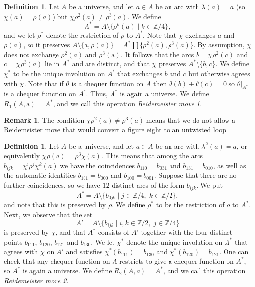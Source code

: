 \documentclass{amsart}
\newcommand{\Z}         {{\mathbb{Z}}}
\newcommand{\sm}        {\setminus}
\newcommand{\st}        {\;|\;}
\newcommand{\tht}       {\theta}
\newcommand{\lm}        {\lambda}
\renewcommand{\:}{\colon}
\theoremstyle{definition}
\newtheorem{remark}[theorem]{Remark}
\newtheorem{definition}[theorem]{Definition}
\begin{document}
\begin{definition}
 Let $A$ be a universe, and let $a\in A$ be an arc with
 $\lm(a)=a$ (so $\chi(a)=\rho(a)$) but
 $\chi\rho^2(a)\neq\rho^3(a)$.  We define  
 \[ A^* = A \sm \{\rho^k(a)\st k\in\Z/4\}, \]
 and we let $\rho^*$ denote the restriction of $\rho$ to $A^*$.  Note
 that $\chi$ exchanges $a$ and $\rho(a)$, so it preserves
 $A\sm\{a,\rho(a)\}=A^*\amalg\{\rho^2(a),\rho^3(a)\}$.  By assumption,
 $\chi$ does not exchange $\rho^2(a)$ and $\rho^3(a)$.  It follows
 that the arcs $b=\chi\rho^2(a)$ and $c=\chi\rho^3(a)$ lie in $A^*$
 and are distinct, and that $\chi$ preserves $A^*\sm\{b,c\}$.  We
 define $\chi^*$ to be the unique involution on $A^*$ that exchanges
 $b$ and $c$ but otherwise agrees with $\chi$.  Note that if $\tht$ is
 a chequer function on $A$ then $\tht(b)+\tht(c)=0$ so $\tht|_{A^*}$
 is a chequer function on $A^*$.  Thus, $A^*$ is again a universe.  We
 define $R_1(A,a)=A^*$, and we call this operation \emph{Reidemeister
  move 1}.
\end{definition}

\begin{remark}
 The condition $\chi\rho^2(a)\neq\rho^3(a)$ means that we do not allow
 a Reidemeister move that would convert a figure eight to an untwisted
 loop.  
\end{remark}

\begin{definition}
 Let $A$ be a universe, and let $a\in A$ be an arc with
 $\lm^2(a)=a$, or equivalently $\chi\rho(a)=\rho^3\chi(a)$.  This
 means that among the arcs $b_{ijk}=\chi^i\rho^j\chi^k(a)$ we have the
 coincidences $b_{110}=b_{031}$ and $b_{131}=b_{010}$, as well as the
 automatic identities $b_{101}=b_{000}$ and $b_{100}=b_{001}$.
 Suppose that there are no further coincidences, so we have $12$
 distinct arcs of the form $b_{ijk}$.  We put 
 \[ A^* = A \sm \{b_{0jk}\st j\in\Z/4,\;k\in\Z/2\}, \]
 and note that this is preserved by $\rho$.  We define $\rho^*$ to be
 the restriction of $\rho$ to $A^*$.  Next, we observe that the set
 \[ A'=A\sm\{b_{ijk}\st i,k\in\Z/2,\;j\in\Z/4\} \]
 is preserved by $\chi$, and that  $A^*$ consists of $A'$ together
 with the four distinct points $b_{111}$, $b_{120}$, $b_{121}$ and
 $b_{130}$.  We let $\chi^*$ denote the unique involution on $A^*$
 that agrees with $\chi$ on $A'$ and satisfies
 $\chi^*(b_{111})=b_{130}$ and $\chi^*(b_{120})=b_{121}$.  One can
 check that any chequer function on $A$ restricts to give a chequer
 function on $A^*$, so $A^*$ is again a universe.  We define
 $R_2(A,a)=A^*$, and we call this operation \emph{Reidemeister move
  2}. 
\end{definition}
\end{document}
